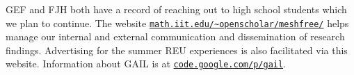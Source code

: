 \documentclass[11pt]{NSFamsart}
\begin{document}
\begin{description}[leftmargin=0ex]
\item[Reaching Out]
GEF and FJH both have a record of reaching out to high school students which we plan to continue. The website \href{http://math.iit.edu/~openscholar/meshfree/}{\nolinkurl{math.iit.edu/~openscholar/meshfree/}} helps manage our internal and external communication and dissemination of research findings. Advertising for the summer REU experiences is also facilitated via this website.  Information about GAIL is at \href{http://code.google.com/p/gail}{\nolinkurl{code.google.com/p/gail}}.
\end{description}

\newpage
\clearpage



\renewcommand{\refname}{References Cited}                   %
\renewcommand{\bibliofont}{\normalsize}


\end{document}
